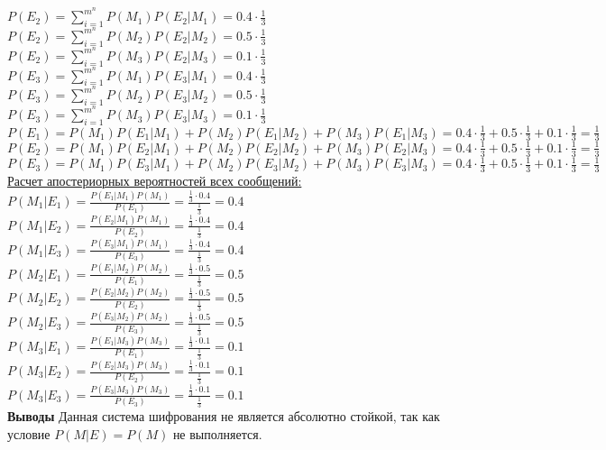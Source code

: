 \documentclass[a4paper,14pt]{extarticle}
\begin{document}
    $P(E_2)=\sum\limits_{i=1}^{m^n} P(M_1)P(E_2|M_1) = 0.4\cdot\frac{1}{3}$\\
    $P(E_2)=\sum\limits_{i=1}^{m^n} P(M_2)P(E_2|M_2) = 0.5\cdot\frac{1}{3}$\\
    $P(E_2)=\sum\limits_{i=1}^{m^n} P(M_3)P(E_2|M_3) = 0.1\cdot\frac{1}{3}$\\
    $P(E_3)=\sum\limits_{i=1}^{m^n} P(M_1)P(E_3|M_1) = 0.4\cdot\frac{1}{3}$\\
    $P(E_3)=\sum\limits_{i=1}^{m^n} P(M_2)P(E_3|M_2) = 0.5\cdot\frac{1}{3}$\\
    $P(E_3)=\sum\limits_{i=1}^{m^n} P(M_3)P(E_3|M_3) = 0.1\cdot\frac{1}{3}$\\
    \noindent$P(E_1)=P(M_1)P(E_1|M_1)+P(M_2)P(E_1|M_2)+P(M_3)P(E_1|M_3)=0.4\cdot\frac{1}{3}+0.5\cdot\frac{1}{3}+0.1\cdot\frac{1}{3}=\frac{1}{3}$\\
    $P(E_2)=P(M_1)P(E_2|M_1)+P(M_2)P(E_2|M_2)+P(M_3)P(E_2|M_3)=0.4\cdot\frac{1}{3}+0.5\cdot\frac{1}{3}+0.1\cdot\frac{1}{3}=\frac{1}{3}$\\
    $P(E_3)=P(M_1)P(E_3|M_1)+P(M_2)P(E_3|M_2)+P(M_3)P(E_3|M_3)=0.4\cdot\frac{1}{3}+0.5\cdot\frac{1}{3}+0.1\cdot\frac{1}{3}=\frac{1}{3}$\\
    \underline{Расчет апостериорных вероятностей всех сообщений:}\\
    \noindent$P(M_1|E_1)=\frac{P(E_1|M_1)P(M_1)}{P(E_1)}=\frac{\frac{1}{3}\cdot0.4}{\frac{1}{3}}=0.4$\\
    $P(M_1|E_2)=\frac{P(E_2|M_1)P(M_1)}{P(E_2)}=\frac{\frac{1}{3}\cdot0.4}{\frac{1}{3}}=0.4$\\
    $P(M_1|E_3)=\frac{P(E_3|M_1)P(M_1)}{P(E_3)}=\frac{\frac{1}{3}\cdot0.4}{\frac{1}{3}}=0.4$\\
    $P(M_2|E_1)=\frac{P(E_1|M_2)P(M_2)}{P(E_1)}=\frac{\frac{1}{3}\cdot0.5}{\frac{1}{3}}=0.5$\\
    $P(M_2|E_2)=\frac{P(E_2|M_2)P(M_2)}{P(E_2)}=\frac{\frac{1}{3}\cdot0.5}{\frac{1}{3}}=0.5$\\
    $P(M_2|E_3)=\frac{P(E_3|M_2)P(M_2)}{P(E_3)}=\frac{\frac{1}{3}\cdot0.5}{\frac{1}{3}}=0.5$\\
    $P(M_3|E_1)=\frac{P(E_1|M_3)P(M_3)}{P(E_1)}=\frac{\frac{1}{3}\cdot0.1}{\frac{1}{3}}=0.1$\\
    $P(M_3|E_2)=\frac{P(E_2|M_3)P(M_3)}{P(E_2)}=\frac{\frac{1}{3}\cdot0.1}{\frac{1}{3}}=0.1$\\
    $P(M_3|E_3)=\frac{P(E_3|M_3)P(M_3)}{P(E_3)}=\frac{\frac{1}{3}\cdot0.1}{\frac{1}{3}}=0.1$\\
    \textbf{Выводы}
    Данная система шифрования не является абсолютно стойкой, так как условие $P(M|E)=P(M)$ не выполняется.
\end{document}
